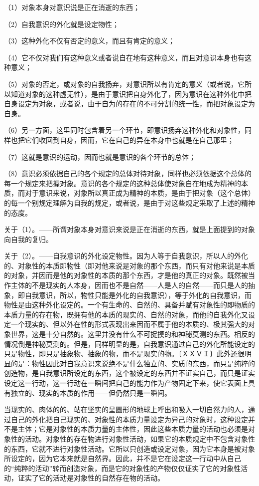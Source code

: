 \documentclass[a4paper,twoside,12pt]{ctexart}
\begin{document}
（1）对象本身对意识说是正在消逝的东西；

（2）自我意识的外化就是设定物性；

（3）这种外化不仅有否定的意义，而且有肯定的意义；

（4）它不仅对我们有这种意义或者说自在地有这种意义，而且对意识本身也有这种意义；

（5）对象的否定，或对象的自我扬弃，对意识所以有肯定的意义（或者说，它所以知道对象的这种虚无性），是由于意识把自身外化了，因为意识在这种外化中把自身设定为对象，或者说，由于自为的存在的不可分割的统一性，而把对象设定为自身。

（6）另一方面，这里同时包含着另一个环节，即意识扬弃这种外化和对象性，同样也把它们收回到自身，因而，它在自己的异在本身中也就是在自己那里；

（7）这就是意识的运动，因而也就是意识的各个环节的总体；

（8）意识必须依据自己的各个规定的总体对待对象，同样也必须依据这个总体的每一个规定来把握对象。意识的各个规定的这种总体使对象自在地成为精神的本质，而对于意识来说，对象所以真正成为精神的本质，是由于把对象（这个总体）的每一个别规定理解为自我的规定，或者说，是由于对这些规定采取了上述的精神的态度。

关于（1）。——所谓对象本身对意识来说是正在消逝的东西，就是上面提到的对象向自我的复归。

关于（2）。——自我意识的外化设定物性。因为人等于自我意识，所以人的外化的、对象性的本质即物性（即对他来说是对象的那个东西，而只有对他来说是本质的对象，并因而是他的对象性的本质的那个东西，才是他的真正的对象。既然被当作主体的不是现实的人本身，因而也不是自然——人是人的自然——而只是人的抽象，即自我意识，所以，物性只能是外化的自我意识），等于外化的自我意识，而物性是由这种外化设定的。一个有生命的、自然的、具备并赋有对象性的即物质的本质力量的存在物，既拥有他的本质的现实的、自然的对象，而他的自我外化又设定一个现实的、但以外在性的形式表现出来因而不属于他的本质的、极其强大的对象世界，这是十分自然的。这里并没有什么不可捉摸的和神秘莫测的东西。相反的情况倒是神秘莫测的。但是，同样明显的是，自我意识通过自己的外化所能设定的只是物性，即只是抽象物、抽象的物，而不是现实的物。〔ＸＸＶＩ〕此外还很明显的是：物性因此对自我意识来说绝不是什么独立的、实质的东西，而只是纯粹的创造物，是自我意识所设定的东西，这个被设定的东西并不证实自己，而只是证实设定这一行动，这一行动在一瞬间把自己的能力作为产物固定下来，使它表面上具有独立的、现实的本质的作用——但仍然只是一瞬间。

当现实的、肉体的的、站在坚实的呈圆形的地球上呼出和吸入一切自然力的人，通过自己的外化把自己现实的、对象性的本质力量设定为异己的对象时，这种设定并不是主体；它是对象性的本质力量的主体性，因此这些本质力量的活动也必须是对象性的活动。对象性的存在物进行对象性活动，如果它的本质规定中不包含对象性的东西，它就不进行对象性活动。它所以只创造或设定对象，因为它本身是被对象所设定的，因为它本来就是自然界。因此，并不是它在设定这一行动中从自己的“纯粹的活动”转而创造对象，而是它的对象性的产物仅仅证实了它的对象性活动，证实了它的活动是对象性的自然存在物的活动。
\end{document}
